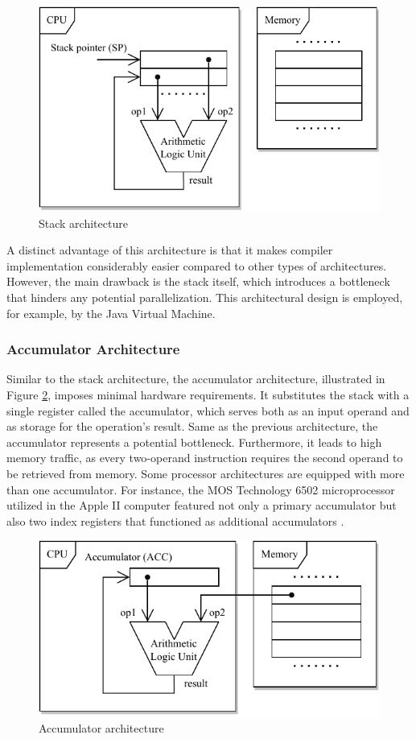 \documentclass[english, ing, kiv, he, iso690numb, pdf]{fasthesis}
\begin{document}
	\begin{figure}[ht]
		\centering
		\includegraphics[width=.6\textwidth]{img/diagrams/stack_architecture.pdf}
		\caption{Stack architecture}
		\label{Stack architecture}
	\end{figure}
	
	A distinct advantage of this architecture is that it makes compiler implementation considerably easier compared to other types of architectures. However, the main drawback is the stack itself, which introduces a bottleneck that hinders any potential parallelization. This architectural design is employed, for example, by the Java Virtual Machine.
	
	\subsubsection{Accumulator Architecture}
	
	Similar to the stack architecture, the accumulator architecture, illustrated in Figure \ref{Accumulator architecture}, imposes minimal hardware requirements. It substitutes the stack with a single register called the accumulator, which serves both as an input operand and as storage for the operation's result. Same as the previous architecture, the accumulator represents a potential bottleneck. Furthermore, it leads to high memory traffic, as every two-operand instruction requires the second operand to be retrieved from memory. Some processor architectures are equipped with more than one accumulator. For instance, the MOS Technology 6502 microprocessor utilized in the \break Apple II computer featured not only a primary accumulator but also two index registers that functioned as additional accumulators \cite{computer-architecture-1}.
	
	\begin{figure}[ht]
		\centering
		\includegraphics[width=.6\textwidth]{img/diagrams/accumulator_architecture.pdf}
		\caption{Accumulator architecture}
		\label{Accumulator architecture}
	\end{figure}
	
\end{document}
